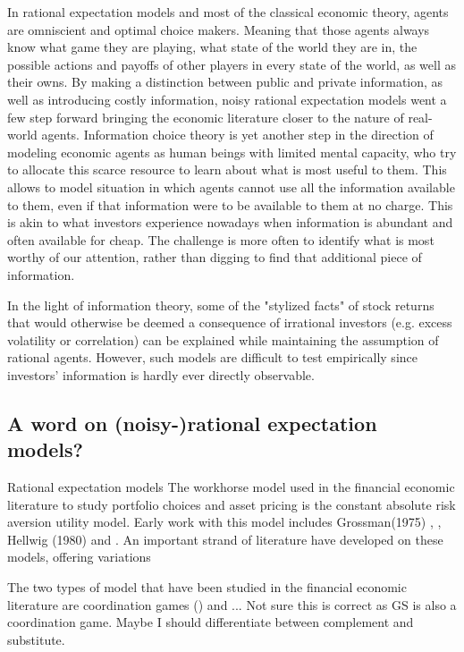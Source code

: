 In rational expectation models and most of the classical economic theory, agents are omniscient and optimal choice makers. Meaning that those agents always know what game they are playing, what state of the world they are in, the possible actions and payoffs of other players in every state of the world, as well as their owns. By making a distinction between public and private information, as well as introducing costly information, noisy rational expectation models went a few step forward bringing the economic literature closer to the nature of real-world agents. Information choice theory is yet another step in the direction of modeling economic agents as human beings with limited mental capacity, who try to allocate this scarce resource to learn about what is most useful to them. This allows to model situation in which agents cannot use all the information available to them, even if that information were to be available to them at no charge. This is akin to what investors experience nowadays when information is abundant and often available for cheap. The challenge is more often to identify what is most worthy of our attention, rather than digging to find that additional piece of information.

\vspace{1cm}

In the light of information theory, some of the "stylized facts" of stock returns that would otherwise be deemed a consequence of irrational investors (e.g. excess volatility or correlation) can be explained while maintaining the assumption of rational agents. However, such models are difficult to test empirically since investors' information is hardly ever directly observable. 


\subsection{A word on (noisy-)rational expectation models?}
Rational expectation models
The workhorse model used in the financial economic literature to study portfolio choices and asset pricing is the constant absolute risk aversion utility model. Early work with this model includes Grossman(1975) , \textcite{Grossman1980}, Hellwig (1980)  and \textcite{Admati1985}. An important strand of literature have developed on these models, offering variations 



The two types of model that have been studied in the financial economic literature are coordination games (\cite{Morris2002}) and ... Not sure this is correct as GS is also a coordination game. Maybe I should differentiate between complement and substitute.


